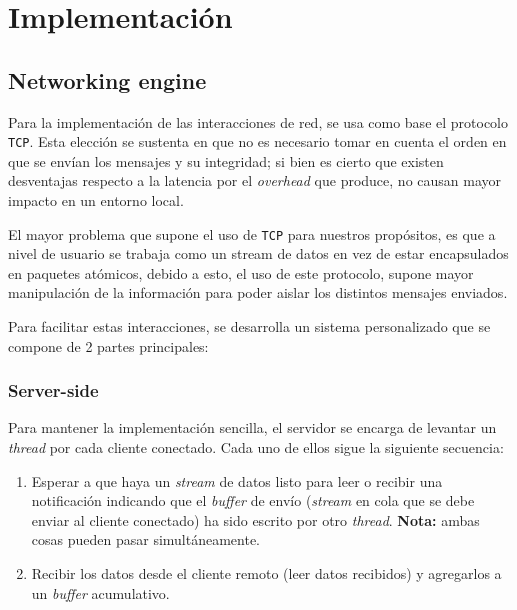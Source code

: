 \section{Implementación}






\subsection{Networking engine}
Para la implementación de las interacciones de red, se usa como base el protocolo \texttt{TCP}. Esta elección se sustenta en que no es necesario tomar en cuenta el orden en que se envían los mensajes y su integridad; si bien es cierto que existen desventajas respecto a la latencia por el \emph{overhead} que produce, no causan mayor impacto en un entorno local.

El mayor problema que supone el uso de \texttt{TCP} para nuestros propósitos, es que a nivel de usuario se trabaja como un stream de datos en vez de estar encapsulados en paquetes atómicos, debido a esto, el uso de este protocolo, supone mayor manipulación de la información para poder aislar los distintos mensajes enviados.

Para facilitar estas interacciones, se desarrolla un sistema personalizado que se compone de 2 partes principales:

\subsubsection*{Server-side}
Para mantener la implementación sencilla, el servidor se encarga de levantar un \emph{thread} por cada cliente conectado. Cada uno de ellos sigue la siguiente secuencia:

\begin{enumerate}
	\item Esperar a que haya un \emph{stream} de datos listo para leer o recibir una notificación indicando que el \emph{buffer} de envío (\emph{stream} en cola que se debe enviar al cliente conectado) ha sido escrito por otro \emph{thread}. \textbf{Nota:} ambas cosas pueden pasar simultáneamente.
	\item Recibir los datos desde el cliente remoto (leer datos recibidos) y agregarlos a un \emph{buffer} acumulativo.
\end{enumerate}